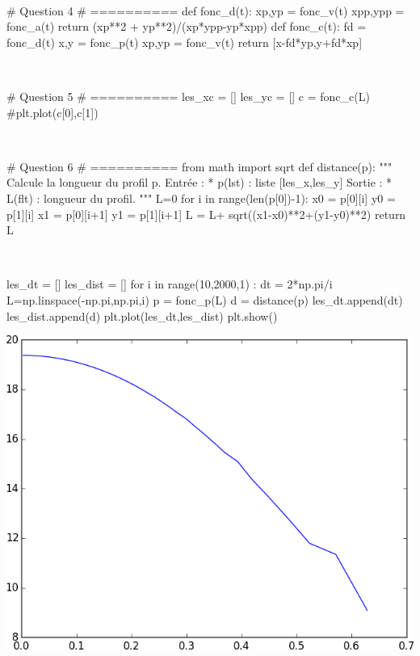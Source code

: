 \documentclass[10pt,fleqn]{article} %
\begin{document}
\begin{multicols}{2}
\columnbreak

\begin{corrige}
$\quad$
\begin{python}
# Question 4
# ==========
def fonc_d(t):
    xp,yp = fonc_v(t)
    xpp,ypp = fonc_a(t)
    return (xp**2 + yp**2)/(xp*ypp-yp*xpp)
def fonc_c(t):
    fd = fonc_d(t)
    x,y = fonc_p(t)
    xp,yp = fonc_v(t)
    return [x-fd*yp,y+fd*xp]
\end{python}
\end{corrige}

\begin{corrige}
$\quad$
\begin{python}
# Question 5
# ==========
les_xc  = []
les_yc  = []
c = fonc_c(L)
#plt.plot(c[0],c[1])
\end{python}
\end{corrige}

\begin{corrige}
$\quad$
\begin{python}
# Question 6
# ==========
from math import sqrt
def distance(p):
    """
    Calcule la longueur du profil p.
    Entrée : 
     * p(lst) : liste [les_x,les_y]
    Sortie : 
     * L(flt) : longueur du profil.
    """
    L=0
    for i in range(len(p[0])-1):
        x0 = p[0][i]
        y0 = p[1][i]
        x1 = p[0][i+1]
        y1 = p[1][i+1]
        L = L+ sqrt((x1-x0)**2+(y1-y0)**2)
    return L
\end{python}
\end{corrige}

\begin{corrige}
$\quad$
\begin{python}
les_dt = []
les_dist = []
for i in range(10,2000,1) :
    dt = 2*np.pi/i
    L=np.linspace(-np.pi,np.pi,i)
    p = fonc_p(L)
    d = distance(p)
    les_dt.append(dt)
    les_dist.append(d)
plt.plot(les_dt,les_dist)
plt.show()       
\end{python}
\end{corrige}


\begin{center}
\includegraphics[width=.8\linewidth]{programmes/Exercice_12/figure_2}


\end{center}
\end{multicols}
\end{document}
